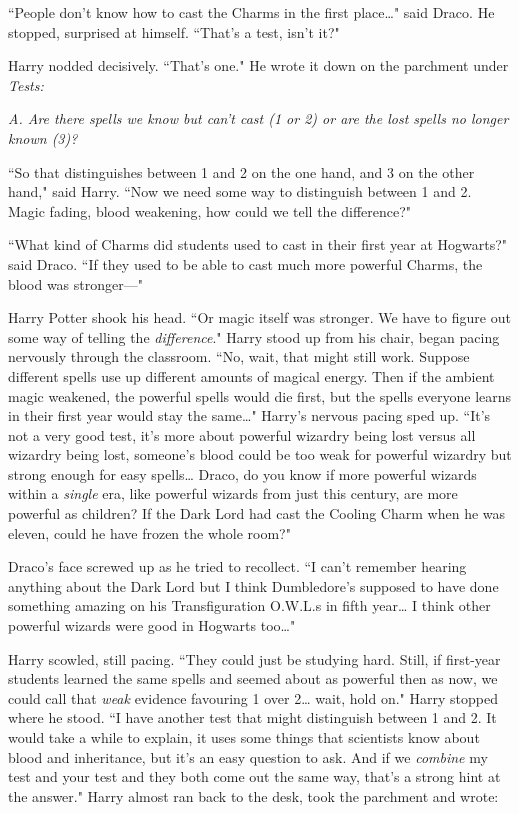 ``People don't know how to cast the Charms in the first place{\ldots}" said Draco. He stopped, surprised at himself. ``That's a test, isn't it?"

Harry nodded decisively. ``That's one." He wrote it down on the parchment under \emph{Tests:}

\emph{A. Are there spells we know but can't cast (1 or 2) or are the lost spells no longer known (3)?}

``So that distinguishes between 1 and 2 on the one hand, and 3 on the other hand," said Harry. ``Now we need some way to distinguish between 1 and 2. Magic fading, blood weakening, how could we tell the difference?"

``What kind of Charms did students used to cast in their first year at Hogwarts?" said Draco. ``If they used to be able to cast much more powerful Charms, the blood was stronger—"

Harry Potter shook his head. ``Or magic itself was stronger. We have to figure out some way of telling the \emph{difference}." Harry stood up from his chair, began pacing nervously through the classroom. ``No, wait, that might still work. Suppose different spells use up different amounts of magical energy. Then if the ambient magic weakened, the powerful spells would die first, but the spells everyone learns in their first year would stay the same{\ldots}" Harry's nervous pacing sped up. ``It's not a very good test, it's more about powerful wizardry being lost versus all wizardry being lost, someone's blood could be too weak for powerful wizardry but strong enough for easy spells{\ldots} Draco, do you know if more powerful wizards within a \emph{single} era, like powerful wizards from just this century, are more powerful as children? If the Dark Lord had cast the Cooling Charm when he was eleven, could he have frozen the whole room?"

Draco's face screwed up as he tried to recollect. ``I can't remember hearing anything about the Dark Lord but I think Dumbledore's supposed to have done something amazing on his Transfiguration O.W.L.s in fifth year{\ldots} I think other powerful wizards were good in Hogwarts too{\ldots}"

Harry scowled, still pacing. ``They could just be studying hard. Still, if first-year students learned the same spells and seemed about as powerful then as now, we could call that \emph{weak} evidence favouring 1 over 2{\ldots} wait, hold on." Harry stopped where he stood. ``I have another test that might distinguish between 1 and 2. It would take a while to explain, it uses some things that scientists know about blood and inheritance, but it's an easy question to ask. And if we \emph{combine} my test and your test and they both come out the same way, that's a strong hint at the answer." Harry almost ran back to the desk, took the parchment and wrote:

